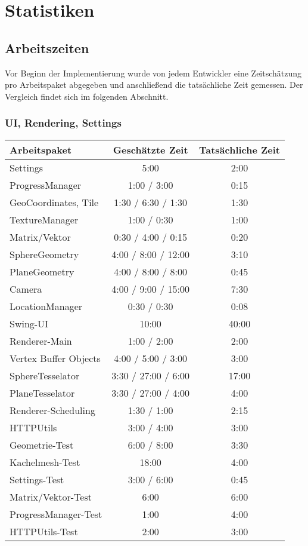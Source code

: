 \documentclass[10pt]{scrreprt}
\begin{document}



\chapter{Statistiken}

\section{Arbeitszeiten}

Vor Beginn der Implementierung wurde von jedem Entwickler eine Zeitschätzung pro Arbeitspaket abgegeben und anschließend die tatsächliche Zeit gemessen. Der Vergleich findet sich im folgenden Abschnitt.

{
\sffamily
\subsection*{UI, Rendering, Settings}
\vspace*{2mm}
\begin{tabular}{|l|c|c|}
\textbf{Arbeitspaket} & \textbf{Geschätzte Zeit} & \textbf{Tatsächliche Zeit}\\
\hline
Settings & 5:00 & 2:00\\
ProgressManager & 1:00 / 3:00 & 0:15\\
GeoCoordinates, Tile & 1:30 / 6:30 / 1:30 & 1:30\\
TextureManager & 1:00 / 0:30 & 1:00\\
Matrix/Vektor & 0:30 / 4:00 / 0:15 & 0:20\\
SphereGeometry & 4:00 / 8:00 / 12:00 & 3:10\\
PlaneGeometry & 4:00 / 8:00 / 8:00 & 0:45\\
Camera & 4:00 / 9:00 / 15:00 & 7:30\\
LocationManager & 0:30 / 0:30 & 0:08\\
Swing-UI & 10:00 & 40:00\\
Renderer-Main & 1:00 / 2:00 & 2:00\\
Vertex Buffer Objects & 4:00 / 5:00 / 3:00 & 3:00\\
SphereTesselator & 3:30 / 27:00 / 6:00 & 17:00\\
PlaneTesselator & 3:30 / 27:00 / 4:00 & 4:00\\
Renderer-Scheduling & 1:30 / 1:00 & 2:15\\
HTTPUtils & 3:00 / 4:00 & 3:00\\
Geometrie-Test & 6:00 / 8:00 & 3:30\\
Kachelmesh-Test & 18:00 & 4:00\\
Settings-Test & 3:00 / 6:00 & 0:45\\
Matrix/Vektor-Test & 6:00 & 6:00\\
ProgressManager-Test & 1:00 & 4:00\\
HTTPUtils-Test & 2:00 & 3:00\\
\end{tabular}

}
\end{document}
